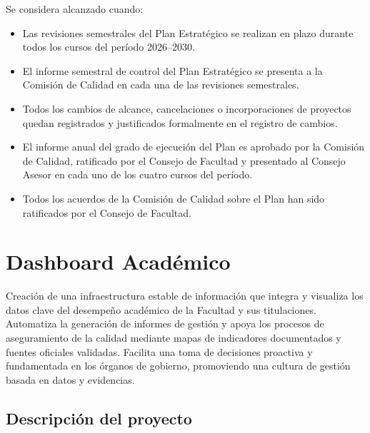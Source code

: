 \documentclass[11pt,a4paper]{scrreprt}
\begin{document}
\vspace{6pt}

\begin{tcolorbox}[pabox={gobcolor}{Objetivo 5. Seguimiento adaptativo del Plan Estratégico}]
\small Se considera alcanzado cuando:
\begin{itemize}[noitemsep,topsep=2pt]
\item Las revisiones semestrales del Plan Estratégico se realizan en plazo durante todos los cursos del período 2026--2030.
\item El informe semestral de control del Plan Estratégico se presenta a la Comisión de Calidad en cada una de las revisiones semestrales.
\item Todos los cambios de alcance, cancelaciones o incorporaciones de proyectos quedan registrados y justificados formalmente en el registro de cambios.
\item El informe anual del grado de ejecución del Plan es aprobado por la Comisión de Calidad, ratificado por el Consejo de Facultad y presentado al Consejo Asesor en cada uno de los cuatro cursos del período.
\item Todos los acuerdos de la Comisión de Calidad sobre el Plan han sido ratificados por el Consejo de Facultad.
\end{itemize}
\end{tcolorbox}

\clearpage

\chapter[Dashboard Acad\'emico]{\textcolor{dashcolor}{Dashboard Acad\'emico}}
\begin{tcolorbox}[descbox]
\small Creación de una infraestructura estable de información que integra y visualiza los datos clave del desempeño académico de la Facultad y sus titulaciones. Automatiza la generación de informes de gestión y apoya los procesos de aseguramiento de la calidad mediante mapas de indicadores documentados y fuentes oficiales validadas. Facilita una toma de decisiones proactiva y fundamentada en los órganos de gobierno, promoviendo una cultura de gestión basada en datos y evidencias.
\end{tcolorbox}

\section{Descripción del proyecto}
\end{document}

